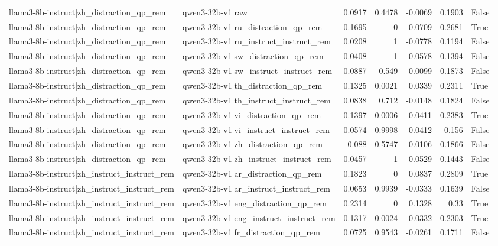 \begin{table}
\begin{tabular}{l l r r r r l}
llama3-8b-instruct|zh_distraction_qp_rem & qwen3-32b-v1|raw & 0.0917 & 0.4478 & -0.0069 & 0.1903 & False \\
llama3-8b-instruct|zh_distraction_qp_rem & qwen3-32b-v1|ru_distraction_qp_rem & 0.1695 & 0 & 0.0709 & 0.2681 & True \\
llama3-8b-instruct|zh_distraction_qp_rem & qwen3-32b-v1|ru_instruct_instruct_rem & 0.0208 & 1 & -0.0778 & 0.1194 & False \\
llama3-8b-instruct|zh_distraction_qp_rem & qwen3-32b-v1|sw_distraction_qp_rem & 0.0408 & 1 & -0.0578 & 0.1394 & False \\
llama3-8b-instruct|zh_distraction_qp_rem & qwen3-32b-v1|sw_instruct_instruct_rem & 0.0887 & 0.549 & -0.0099 & 0.1873 & False \\
llama3-8b-instruct|zh_distraction_qp_rem & qwen3-32b-v1|th_distraction_qp_rem & 0.1325 & 0.0021 & 0.0339 & 0.2311 & True \\
llama3-8b-instruct|zh_distraction_qp_rem & qwen3-32b-v1|th_instruct_instruct_rem & 0.0838 & 0.712 & -0.0148 & 0.1824 & False \\
llama3-8b-instruct|zh_distraction_qp_rem & qwen3-32b-v1|vi_distraction_qp_rem & 0.1397 & 0.0006 & 0.0411 & 0.2383 & True \\
llama3-8b-instruct|zh_distraction_qp_rem & qwen3-32b-v1|vi_instruct_instruct_rem & 0.0574 & 0.9998 & -0.0412 & 0.156 & False \\
llama3-8b-instruct|zh_distraction_qp_rem & qwen3-32b-v1|zh_distraction_qp_rem & 0.088 & 0.5747 & -0.0106 & 0.1866 & False \\
llama3-8b-instruct|zh_distraction_qp_rem & qwen3-32b-v1|zh_instruct_instruct_rem & 0.0457 & 1 & -0.0529 & 0.1443 & False \\
llama3-8b-instruct|zh_instruct_instruct_rem & qwen3-32b-v1|ar_distraction_qp_rem & 0.1823 & 0 & 0.0837 & 0.2809 & True \\
llama3-8b-instruct|zh_instruct_instruct_rem & qwen3-32b-v1|ar_instruct_instruct_rem & 0.0653 & 0.9939 & -0.0333 & 0.1639 & False \\
llama3-8b-instruct|zh_instruct_instruct_rem & qwen3-32b-v1|eng_distraction_qp_rem & 0.2314 & 0 & 0.1328 & 0.33 & True \\
llama3-8b-instruct|zh_instruct_instruct_rem & qwen3-32b-v1|eng_instruct_instruct_rem & 0.1317 & 0.0024 & 0.0332 & 0.2303 & True \\
llama3-8b-instruct|zh_instruct_instruct_rem & qwen3-32b-v1|fr_distraction_qp_rem & 0.0725 & 0.9543 & -0.0261 & 0.1711 & False \\

\end{tabular}
\end{table}
